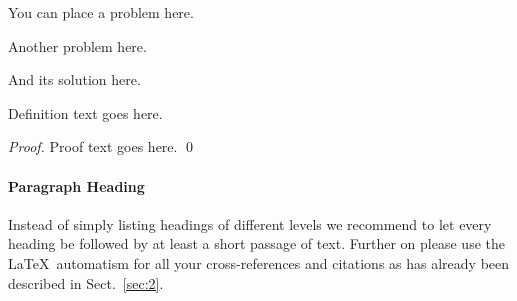 \begin{bibunit}
	
	\begin{problem}
		You can place a problem here.
	\end{problem}
	
	\begin{problem}{\nocaption}
		Another problem here.
	\end{problem}
	
	\begin{solution}
		And its solution here.
	\end{solution}
	
	\begin{definition}
		Definition text goes here.
	\end{definition}
	
	\begin{proof}
		Proof text goes here. \qed
	\end{proof}
	
	
	\paragraph{Paragraph Heading} %
	Instead of simply listing headings of different levels we recommend to let every heading be followed by at least a short passage of text.  Further on please use the \LaTeX\ automatism for all your cross-references and citations as has already been described in Sect.~\ref{sec:2}.
	

\end{bibunit}
